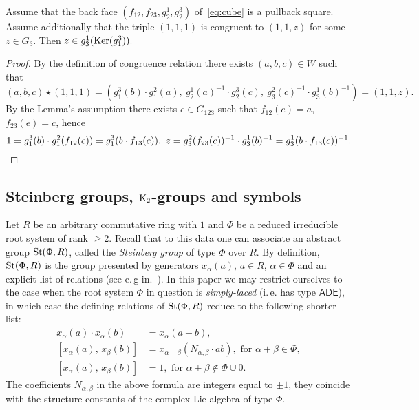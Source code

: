 \begin{lemma}\label{one-one-z} Assume that the back face $(f_{12}, f_{23}, g_2^1, g_2^3)$ of~\eqref{eq:cube} is a pullback square.
Assume additionally that the triple $(1, 1, 1)$ is congruent to $(1, 1, z)$ for some $z\in G_3$.
Then $z \in g_3^1(\operatorname{Ker}(g_1^3)).$ \end{lemma}
\begin{proof} By the definition of congruence relation there exists $(a, b, c)\in W$ such that
\[ (a, b, c) \star (1, 1, 1) = ( g_1^3(b) \cdot g_1^2(a),\ g_2^1(a)^{-1} \cdot g_2^3(c),\ g_3^2(c)^{-1} \cdot g_3^1(b)^{-1}) = (1,1,z). \]
By the Lemma's assumption there exists $e \in G_{123}$ such that $f_{12}(e) = a$, $f_{23}(e) = c$, hence
\[ 1 = g_1^3(b) \cdot g_1^2(f_{12}(e)) = g_1^3(b \cdot f_{13}(e)),\ z = g_3^2(f_{23}(e))^{-1} \cdot g_3^1(b)^{-1} = g_3^1(b \cdot f_{13}(e))^{-1}. \qedhere\] \end{proof}

\subsection{Steinberg groups, $\operatorname{K}_2$-groups and symbols}\label{subsec:steinberg-preliminaries}
Let $R$ be an arbitrary commutative ring with $1$ and $\Phi$ be a reduced irreducible root system of rank $\geq 2$.
Recall that to this data one can associate an abstract group $\operatorname{St}(\Phi, R)$, called the \textit{Steinberg group} of type $\Phi$ over $R$.
By definition, $\operatorname{St}(\Phi, R)$ is the group presented by generators $x_\alpha(a)$, $a \in R$, $\alpha \in \Phi$ and an explicit list of relations (see e.\,g in.~\cite{Ma69, Re75, St71}).
In this paper we may restrict ourselves to the case when the root system $\Phi$ in question is \textit{simply-laced} (i.\,e. has type $\mathsf{ADE}$),
 in which case the defining relations of $\operatorname{St}(\Phi, R)$ reduce to the following shorter list:
\begin{align}
x_{\alpha}(a)\cdot x_{\alpha}(b)&=x_{\alpha}(a+b), \tag{R1} \label{x-additivity}\\
[x_{\alpha}(a),\,x_{\beta}(b)]  &=x_{\alpha+\beta}(N_{\alpha,\beta} \cdot ab),\text{ for }\alpha+\beta\in\Phi, \tag{R2} \label{R2} \\
[x_{\alpha}(a),\,x_{\beta}(b)]  &=1,\text{ for }\alpha+\beta\not\in\Phi\cup0. \tag{R3} \label{R3}
\end{align}
The coefficients $N_{\alpha,\beta}$ in the above formula are integers equal to $\pm 1$, they coincide with the structure constants of the complex Lie algebra of type $\Phi$.

